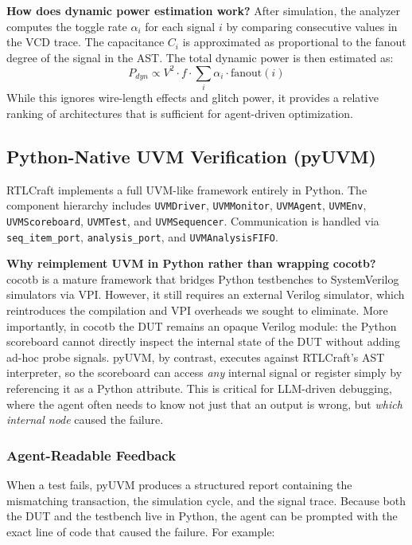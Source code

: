 \documentclass[11pt]{article}
\begin{document}
\textbf{How does dynamic power estimation work?} After simulation, the analyzer computes the toggle rate $\alpha_i$ for each signal $i$ by comparing consecutive values in the VCD trace. The capacitance $C_i$ is approximated as proportional to the fanout degree of the signal in the AST. The total dynamic power is then estimated as:
\begin{equation}
P_{dyn} \propto V^2 \cdot f \cdot \sum_i \alpha_i \cdot \text{fanout}(i)
\end{equation}
While this ignores wire-length effects and glitch power, it provides a relative ranking of architectures that is sufficient for agent-driven optimization.

\subsection{Python-Native UVM Verification (pyUVM)}
\label{sec:uvm}

RTLCraft implements a full UVM-like framework entirely in Python. The component hierarchy includes \texttt{UVMDriver}, \texttt{UVMMonitor}, \texttt{UVMAgent}, \texttt{UVMEnv}, \texttt{UVMScoreboard}, \texttt{UVMTest}, and \texttt{UVMSequencer}. Communication is handled via \texttt{seq\_item\_port}, \texttt{analysis\_port}, and \texttt{UVMAnalysisFIFO}.

\textbf{Why reimplement UVM in Python rather than wrapping cocotb?} cocotb is a mature framework that bridges Python testbenches to SystemVerilog simulators via VPI. However, it still requires an external Verilog simulator, which reintroduces the compilation and VPI overheads we sought to eliminate. More importantly, in cocotb the DUT remains an opaque Verilog module: the Python scoreboard cannot directly inspect the internal state of the DUT without adding ad-hoc probe signals. pyUVM, by contrast, executes against RTLCraft's AST interpreter, so the scoreboard can access \textit{any} internal signal or register simply by referencing it as a Python attribute. This is critical for LLM-driven debugging, where the agent often needs to know not just that an output is wrong, but \textit{which internal node} caused the failure.

\subsubsection{Agent-Readable Feedback}

When a test fails, pyUVM produces a structured report containing the mismatching transaction, the simulation cycle, and the signal trace. Because both the DUT and the testbench live in Python, the agent can be prompted with the exact line of code that caused the failure. For example:
\end{document}
